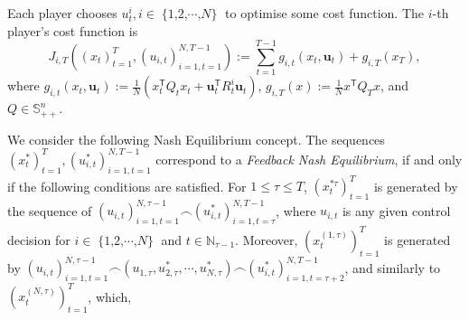 \documentclass[letterpaper, 10 pt, conference]{ieeeconf}  %
\newcommand{\transpose}{\mathsf{T}}
\DeclareMathOperator{\Nplayers}{\{1,2,\cdots,\textit{N}\}}
\begin{document}
Each player chooses $u_{t}^{i},i \in \Nplayers$ to optimise some cost function. The $i$-th player's cost function is
\begin{equation}\label{eq:LQcost}
    J_{i,T}((x_{t})_{t=1}^{T},(u_{i,t})_{i=1,t=1}^{N,T-1}) := \sum_{t=1}^{T-1} g_{i,t}(x_{t}, \mathbf{u}_{t}) + g_{i,T}(x_{T}),
\end{equation}
where $g_{i,t}(x_{t}, \mathbf{u}_{t}) := \frac{1}{N}(x_{t}^{\mathsf{T}}Q_{t}x_{t} + 
    \mathbf{u}_{t}^{\transpose}R_{t}^{i}\mathbf{u}_{t})$,
    $g_{i,T}(x) := \frac{1}{N} x^{\mathsf{T}}Q_{T}x$, and $Q\in\mathbb{S}_{++}^n$.

We consider the following Nash Equilibrium concept.
The sequences $(x_{t}^{*})_{t=1}^{T},(u_{i,t}^{*})_{i=1,t=1}^{N,T-1}$ correspond to a \emph{Feedback Nash Equilibrium}, if and only if the following conditions are satisfied. For $1 \leq \tau \leq T$, $(x_{t}^{*\tau})_{t=1}^{T}$ is generated by the sequence of $(u_{i,t})_{i=1,t=1}^{N,\tau-1} \frown (u_{i,t}^{*})_{i=1,t=\tau}^{N,T-1}$, where $u_{i,t}$ is any given control decision for $i \in \Nplayers$ and $t \in \mathbb{N}_{\tau-1}$. Moreover, $(x_{t}^{(1,\tau)})_{t=1}^{T}$ is generated by $(u_{i,t})_{i=1,t=1}^{N,\tau-1} \frown (u_{1,\tau},u_{2,\tau}^{*},\cdots,u_{N,\tau}^{*}) \frown (u_{i,t}^{*})_{i=1,t=\tau+2}^{N,T-1}$, and similarly to $(x_{t}^{(N,\tau)})_{t=1}^{T}$, which,
\end{document}
